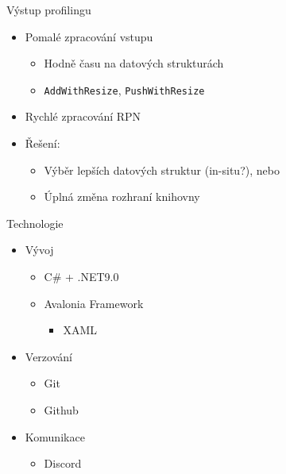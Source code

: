 \documentclass[fleqn]{beamer}
\begin{document}
\begin{frame}{Výstup profilingu}

\begin{itemize}
    \item Pomalé zpracování vstupu
    \begin{itemize}
        \item Hodně času na datových strukturách \pause
        \item \texttt{AddWithResize}, \texttt{PushWithResize}
    \end{itemize}
    \pause
    \item Rychlé zpracování RPN
    \pause
    \item Řešení:
    \pause
    \begin{itemize}
        \item Výběr lepších datových struktur (in-situ?)\pause, nebo
        \item Úplná změna rozhraní knihovny
    \end{itemize}
\end{itemize}
    
\end{frame}






\begin{frame}{Technologie}
\bigskip
\begin{itemize}
    \item Vývoj
    \pause
    \begin{itemize}
        \item C\# + .NET9.0
        \pause
        \item Avalonia Framework
        \begin{itemize}
            \item XAML
        \end{itemize}
        \pause
    \end{itemize}
    \item Verzování
    \pause
    \begin{itemize}
        \item Git\pause
        \item Github
    \end{itemize}
    \pause
    \item Komunikace
    \pause
    \begin{itemize}
        \item Discord
    \end{itemize}
   
\end{itemize}

\end{frame}
\end{document}
